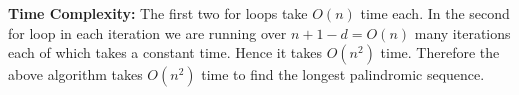 \documentclass[a4paper, 11pt]{article}
\begin{document}
{\begin{algorithm}
{

}
\caption{$(S)$}
\end{algorithm}\parinf

\textbf{Time Complexity:} The first two for loops take $O(n)$ time each. In the second for loop in each iteration we are running over $n+1-d=O(n)$ many iterations each of which takes a constant time. Hence it takes $O(n^2)$ time. Therefore the above algorithm takes $O(n^2)$ time to find the longest palindromic sequence. 

}
\end{document}
